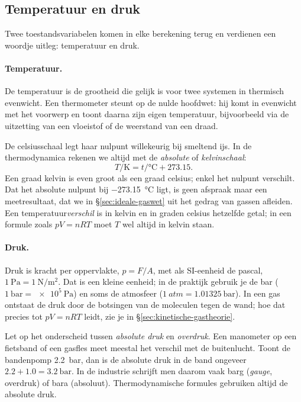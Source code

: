 \subsection{Temperatuur en druk}

Twee toestandsvariabelen komen in elke berekening terug en verdienen een woordje uitleg: temperatuur en druk.

\paragraph{Temperatuur.} De temperatuur is de grootheid die gelijk is voor twee systemen in thermisch evenwicht. Een thermometer steunt op de nulde hoofdwet: hij komt in evenwicht met het voorwerp en toont daarna zijn eigen temperatuur, bijvoorbeeld via de uitzetting van een vloeistof of de weerstand van een draad.

De celsiusschaal legt haar nulpunt willekeurig bij smeltend ijs. In de thermodynamica rekenen we altijd met de \emph{absolute} of \emph{kelvinschaal}:
\begin{equation}
T/\si{\kelvin} = t/\si{\celsius} + 273.15 .
\end{equation}
Een graad kelvin is even groot als een graad celsius; enkel het nulpunt verschilt. Dat het absolute nulpunt bij \SI{-273.15}{\celsius} ligt, is geen afspraak maar een meetresultaat, dat we in \S\ref{sec:ideale-gaswet} uit het gedrag van gassen afleiden. Een temperatuur\emph{verschil} is in kelvin en in graden celsius hetzelfde getal; in een formule zoals $pV = nRT$ moet $T$ wel altijd in kelvin staan.

\paragraph{Druk.} Druk is kracht per oppervlakte, $p = F/A$, met als SI-eenheid de pascal, $\SI{1}{\pascal} = \SI{1}{\newton\per\metre\squared}$. Dat is een kleine eenheid; in de praktijk gebruik je de bar ($\SI{1}{\bar} = \SI{e5}{\pascal}$) en soms de atmosfeer ($\SI{1}{atm} = \SI{1.01325}{\bar}$). In een gas ontstaat de druk door de botsingen van de moleculen tegen de wand; hoe dat precies tot $pV = nRT$ leidt, zie je in \S\ref{sec:kinetische-gastheorie}.

Let op het onderscheid tussen \emph{absolute druk} en \emph{overdruk}. Een manometer op een fietsband of een gasfles meet meestal het verschil met de buitenlucht. Toont de bandenpomp \SI{2.2}{\bar}, dan is de absolute druk in de band ongeveer $2.2 + 1.0 = \SI{3.2}{\bar}$. In de industrie schrijft men daarom vaak barg (\emph{gauge}, overdruk) of bara (absoluut). Thermodynamische formules gebruiken altijd de absolute druk.

